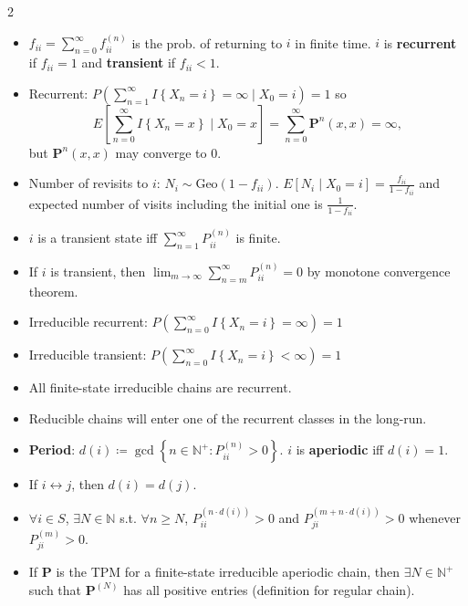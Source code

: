 \documentclass[8pt]{article}
\begin{document}
\begin{multicols*}{2}
\begin{itemize}
            \item $f_{ii} = \sum_{n = 0}^{\infty}f_{ii}^{\left(n\right)}$ is the prob. of returning to $i$ in finite time. $i$ is \textbf{recurrent} if $f_{ii} = 1$ and \textbf{transient} if $f_{ii} < 1$.
            \item Recurrent: $P\left(\sum_{n = 1}^{\infty}I\left\{X_n = i\right\} = \infty \mid X_0 = i\right) = 1$ so 
            \begin{equation*}
                E\left[\sum_{n = 0}^{\infty}I{\left\{X_n = x\right\}} \mid X_0 = x\right] = \sum_{n = 0}^{\infty}\bm{P}^n\left(x, x\right) = \infty,
            \end{equation*}
            but $\bm{P}^n\left(x, x\right)$ may converge to $0$.
            \item Number of revisits to $i$: $N_i \sim \mathrm{Geo}\left(1 - f_{ii}\right)$. $E\left[N_i \mid X_0 = i\right] = \frac{f_{ii}}{1 - f_{ii}}$ and expected number of visits including the initial one is $\frac{1}{1 - f_{ii}}$.
            \item $i$ is a transient state iff $\sum_{n = 1}^{\infty}P_{ii}^{\left(n\right)}$ is finite.
            \item If $i$ is transient, then $\lim_{m \to \infty}\sum_{n = m}^{\infty}P_{ii}^{\left(n\right)} = 0$ by monotone convergence theorem.
            \item Irreducible recurrent: $P\left(\sum_{n = 0}^{\infty}I{\left\{X_n = i\right\}} = \infty\right) = 1$
            \item Irreducible transient: $P\left(\sum_{n = 0}^{\infty}I{\left\{X_n = i\right\}} < \infty\right) = 1$
            \item All finite-state irreducible chains are recurrent.
            \item Reducible chains will enter one of the recurrent classes in the long-run.
            \item \textbf{Period}: $d\left(i\right) \coloneqq \gcd\left\{n \in \mathbb{N}^+ \colon P_{ii}^{\left(n\right)} > 0\right\}$. $i$ is \textbf{aperiodic} iff $d\left(i\right) = 1$.
            \item If $i \leftrightarrow j$, then $d\left(i\right) = d\left(j\right)$.
            \item $\forall i \in S$, $\exists N \in \mathbb{N}$ s.t. $\forall n \geq N$, $P_{ii}^{\left(n \cdot d\left(i\right)\right)} > 0$ and $P_{ji}^{\left(m + n \cdot d\left(i\right)\right)} > 0$ whenever $P_{ji}^{\left(m\right)} > 0$.
            \item If $\bm{P}$ is the TPM for a finite-state irreducible aperiodic chain, then $\exists N \in \mathbb{N}^+$ such that $\bm{P}^{\left(N\right)}$ has all positive entries (definition for regular chain).

\end{itemize}
\end{multicols*}
\end{document}

